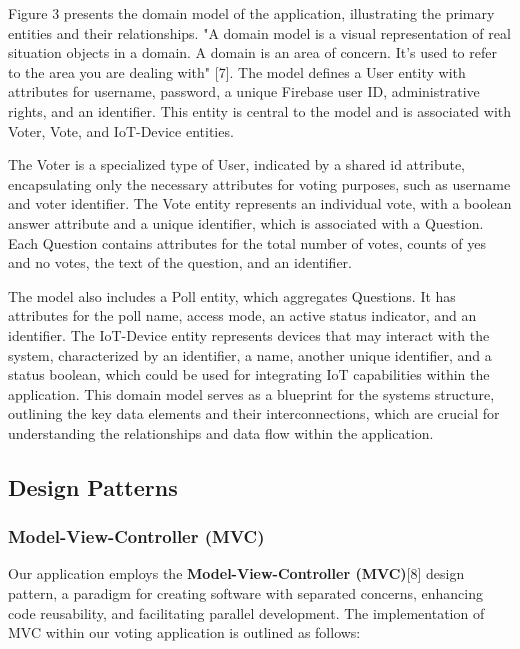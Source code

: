 Figure 3 presents the domain model of the application, illustrating the primary entities and their relationships. "A domain model is a visual representation of real situation objects in a domain. A domain is an area of concern. It's used to refer to the area you are dealing with" [7]. The model defines a User entity with attributes for username, password, a unique Firebase user ID, administrative rights, and an identifier. This entity is central to the model and is associated with Voter, Vote, and IoT-Device entities.

The Voter is a specialized type of User, indicated by a shared id attribute, encapsulating only the necessary attributes for voting purposes, such as username and voter identifier. The Vote entity represents an individual vote, with a boolean answer attribute and a unique identifier, which is associated with a Question. Each Question contains attributes for the total number of votes, counts of yes and no votes, the text of the question, and an identifier.

The model also includes a Poll entity, which aggregates Questions. It has attributes for the poll name, access mode, an active status indicator, and an identifier. The IoT-Device entity represents devices that may interact with the system, characterized by an identifier, a name, another unique identifier, and a status boolean, which could be used for integrating IoT capabilities within the application. This domain model serves as a blueprint for the systems structure, outlining the key data elements and their interconnections, which are crucial for understanding the relationships and data flow within the application.

\subsection{Design Patterns}

\subsubsection{Model-View-Controller (MVC)}

Our application employs the \textbf{Model-View-Controller (MVC)}[8] design pattern, a paradigm for creating software with separated concerns, enhancing code reusability, and facilitating parallel development. The implementation of MVC within our voting application is outlined as follows:

